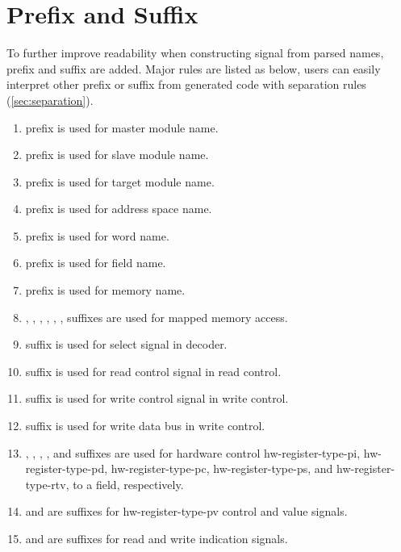 \documentclass[10pt,oneside]{book}
\begin{document}
\section{Prefix and Suffix}
To further improve readability when constructing signal from 
parsed names, prefix and suffix are added. Major rules are listed as
below, users can easily interpret other prefix or suffix from generated
code with separation rules (\autoref{sec:separation}). 
\begin{enumerate}
\item {} prefix is used for master module name.
\item {} prefix is used for slave module name. 
\item {} prefix is used for target module name.
\item {} prefix is used for address space name. 
\item {} prefix is used for \gls{word} name.
\item {} prefix is used for \gls{field} name.
\item {} prefix is used for memory name. 
\item {}, , , , , , 
  suffixes are used for mapped memory access.
\item {} suffix is used for select signal in decoder.
\item {} suffix is used for read control signal in read control.
\item {} suffix is used for write control signal in write control. 
\item {} suffix is used for write data bus in write control.
\item {}, , , , and  suffixes
  are used for hardware control \gls{hw-register-type-pi}, 
  \gls{hw-register-type-pd}, 
  \gls{hw-register-type-pc}, 
  \gls{hw-register-type-ps}, 
  and \gls{hw-register-type-rtv}, to a \gls{field}, respectively. 
\item {} and  are suffixes for \gls{hw-register-type-pv}
  control and value signals. 
\item {} and  are suffixes for 
  read and write indication signals. 
\end{enumerate}
\end{document}
